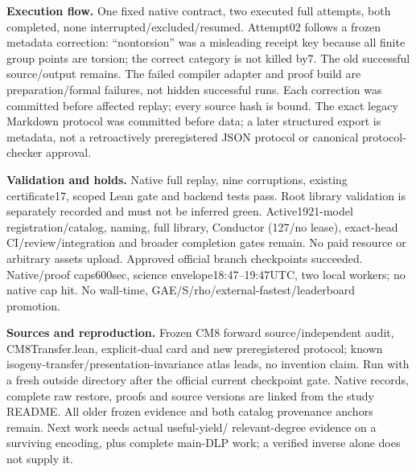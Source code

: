 \documentclass[10pt]{article}
\begin{document}
\textbf{Execution flow.} One fixed native contract, two executed full attempts,
both completed, none interrupted/excluded/resumed. Attempt02 follows a frozen
metadata correction: ``nontorsion'' was a misleading receipt key because all
finite group points are torsion; the correct category is not killed by7.
The old successful source/output remains. The failed compiler adapter and
proof build are preparation/formal failures, not hidden successful runs.
Each correction was committed before affected replay; every source hash is bound.
The exact legacy Markdown protocol was committed before data; a later structured
export is metadata, not a retroactively preregistered JSON protocol or canonical
protocol-checker approval.

\textbf{Validation and holds.} Native full replay, nine corruptions, existing
certificate17, scoped Lean gate and backend tests pass. Root library validation
is separately recorded and must not be inferred green. Active1921-model
registration/catalog, naming, full library, Conductor (127/no lease), exact-head
CI/review/integration and broader completion gates remain. No paid resource or
arbitrary assets upload. Approved official branch checkpoints succeeded.
Native/proof caps600sec, science envelope18:47--19:47UTC, two local workers;
no native cap hit. No wall-time, GAE/S/rho/external-fastest/leaderboard promotion.

\textbf{Sources and reproduction.} Frozen CM8 forward source/independent audit,
CM8Transfer.lean, explicit-dual card and new preregistered protocol; known
isogeny-transfer/presentation-invariance atlas leads, no invention claim.
Run  with a fresh outside directory after the official
current checkpoint gate. Native records, complete raw restore, proofs and
source versions are linked from the study README. All older frozen evidence
and both catalog provenance anchors remain. Next work needs actual useful-yield/
relevant-degree evidence on a surviving encoding, plus complete main-DLP work;
a verified inverse alone does not supply it.
\end{document}
